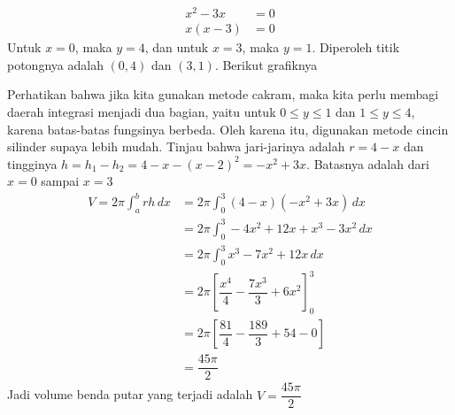 \documentclass{article}
\begin{document}
\begin{enumerate}
\begin{align*}
	x^2-3x &= 0\\
	x(x-3) &= 0
	\end{align*}
	Untuk $x=0$, maka $y=4$, dan untuk $x=3$, maka $y=1$. Diperoleh titik potongnya adalah $(0,4)$ dan $(3,1)$. Berikut grafiknya
	\begin{center}
		\end{center}
	Perhatikan bahwa jika kita gunakan metode cakram, maka kita perlu membagi daerah integrasi menjadi dua bagian, yaitu untuk $0\leq y\leq 1$ dan $1\leq y\leq 4$, karena batas-batas fungsinya berbeda. Oleh karena itu, digunakan metode cincin silinder supaya lebih mudah. 
	Tinjau bahwa jari-jarinya adalah $r=4-x$ dan tingginya $h=h_1-h_2=4-x-(x-2)^2=-x^2+3x$. Batasnya adalah dari $x=0$ sampai $x=3$
	\begin{align*}
	V = 2\pi \int_a^b rh \, dx &= 2\pi \int_0^3 (4-x)(-x^2+3x)\, dx \\
	&= 2\pi \int_0^3 -4x^2 +12x+x^3-3x^2\, dx\\
	&= 2\pi \int_0^3 x^3-7x^2+12x\, dx\\
	&= 2\pi \left[\dfrac{x^4}{4}-\dfrac{7x^3}{3}+6x^2\right]^3_0\\
	&= 2\pi \left[\dfrac{81}{4}-\dfrac{189}{3}+54-0\right]\\
	&= \dfrac{45\pi}{2}
	\end{align*}
	Jadi volume benda putar yang terjadi adalah $V=\dfrac{45\pi}{2}$
\end{enumerate}
\end{document}
